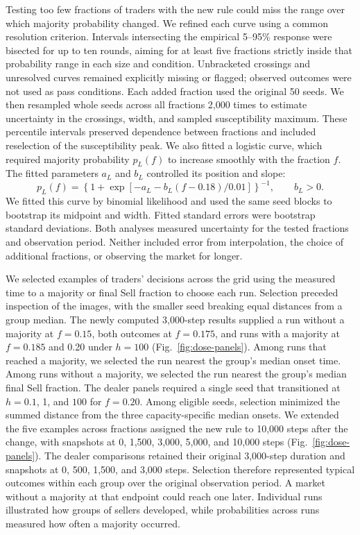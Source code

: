 Testing too few fractions of traders with the new rule could miss the
range over which majority probability changed. We refined each curve using a common
resolution criterion. Intervals intersecting the empirical 5--95\% response were
bisected for up to ten rounds, aiming for at least five fractions
strictly inside that probability range in each size and condition.
Unbracketed crossings and unresolved curves remained explicitly missing
or flagged; observed outcomes were not used as pass conditions. Each added fraction used
the original 50 seeds. We then resampled whole seeds across all fractions
2,000 times to estimate uncertainty in the crossings, width, and sampled
susceptibility maximum. These percentile intervals preserved dependence
between fractions and included reselection of the susceptibility peak.
We also fitted a logistic curve, which required majority probability
$p_L(f)$ to increase smoothly with the fraction $f$. The fitted
parameters $a_L$ and $b_L$ controlled its position and slope:
\begin{equation*}
p_L(f)=\left\{1+\exp\left[-a_L-b_L(f-0.18)/0.01\right]\right\}^{-1},
\qquad b_L>0.
\end{equation*}
We fitted this curve by binomial likelihood and used the same seed blocks
to bootstrap its midpoint and width. Fitted standard errors were bootstrap
standard deviations. Both analyses measured uncertainty for the tested fractions and
observation period. Neither included error from interpolation, the
choice of additional fractions, or observing the market for longer.

We selected examples of traders' decisions across the grid using the
measured time to a majority or final Sell fraction to choose each run.
Selection preceded inspection of the images, with the smaller seed
breaking equal distances from a group median.
The newly computed 3,000-step results supplied a run without a majority at
$f=0.15$, both outcomes at $f=0.175$, and runs with a majority at
$f=0.185$ and 0.20 under $h=100$ (Fig.~\ref{fig:dose-panels}).
Among runs that reached a majority, we selected the run nearest the
group's median onset time. Among runs without a majority, we selected
the run nearest the group's median final Sell fraction. The dealer panels
required a single seed that transitioned at $h=0.1$, 1, and $100$ for
$f=0.20$. Among eligible seeds, selection minimized the summed distance
from the three capacity-specific median onsets. We extended the five examples
across fractions assigned the new rule to 10,000 steps after the change, with
snapshots at 0, 1,500, 3,000, 5,000, and 10,000 steps
(Fig.~\ref{fig:dose-panels}). The dealer comparisons retained their original
3,000-step duration and snapshots at 0, 500, 1,500, and 3,000 steps.
Selection therefore represented typical outcomes within each group over
the original observation period. A market without a majority at that
endpoint could reach one later. Individual runs illustrated how groups of
sellers developed, while
probabilities across runs measured how often a majority occurred.
